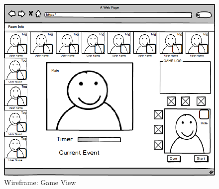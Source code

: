 \documentclass[11pt]{article}
\begin{document}
\begin{figure}
\centering
\includegraphics[width=0.7\linewidth, keepaspectratio]{wf-ingame.png}
\caption{Wireframe: Game View}
\label{fig:game}
\end{figure}



\end{document}
